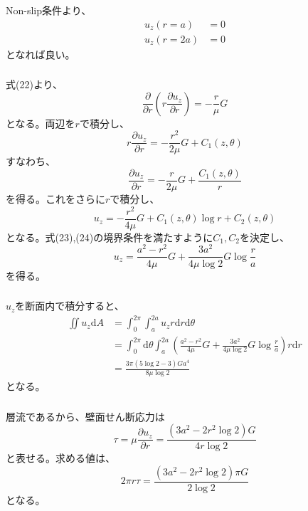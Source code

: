 \documentclass[a4paper]{jsarticle}
\begin{document}
\subsubsection{}
Non-slip条件より、
\begin{align}
  u_z (r = a) &= 0 \\
  u_z (r = 2a) &= 0
\end{align}
となれば良い。

\subsubsection{}
式(22)より、
\begin{equation}
  \frac{\partial}{\partial r} \left(r \frac{\partial u_z}{\partial r}\right)
  = -\frac{r}{\mu} G
\end{equation}
となる。両辺を$r$で積分し、
\begin{equation}
  r \frac{\partial u_z}{\partial r}
  = -\frac{r^2}{2\mu} G + C_1(z, \theta)
\end{equation}
すなわち、
\begin{equation}
  \frac{\partial u_z}{\partial r}
  = -\frac{r}{2 \mu} G + \frac{C_1(z, \theta)}{r}
\end{equation}
を得る。これをさらに$r$で積分し、
\begin{equation}
  u_z = -\frac{r^2}{4 \mu} G + C_1(z, \theta) \log r + C_2(z, \theta)
\end{equation}
となる。式(23),(24)の境界条件を満たすように$C_1, C_2$を決定し、
\begin{equation}
  u_z = \frac{a^2 - r^2}{4 \mu} G + \frac{3 a^2}{4 \mu \log 2} G \log \frac{r}{a}
\end{equation}
を得る。

\subsubsection{}
$u_z$を断面内で積分すると、
\begin{equation}
  \begin{aligned}
    \iint u_z \mathrm{d} A &=
    \int_0^{2 \pi} \int_a^{2a} u_z r \mathrm{d} r \mathrm{d} \theta \\
    &= \int_0^{2 \pi} \mathrm{d} \theta
    \int_a^{2a} \left(\frac{a^2 - r^2}{4 \mu} G + \frac{3 a^2}{4 \mu \log 2} G \log \frac{r}{a}\right) r \mathrm{d} r \\
    &= \frac{3 \pi (5 \log 2 - 3) G a^4}{8 \mu \log 2}
  \end{aligned}
\end{equation}
となる。

\subsubsection{}
層流であるから、壁面せん断応力は
\begin{equation}
  \tau = \mu \frac{\partial u_z}{\partial r}
  = \frac{(3 a^2 - 2 r^2 \log 2)G}{4 r \log 2}
\end{equation}
と表せる。求める値は、
\begin{equation}
  2 \pi r \tau = \frac{(3 a^2 - 2 r^2 \log 2) \pi G}{2 \log 2}
\end{equation}
となる。
\end{document}
